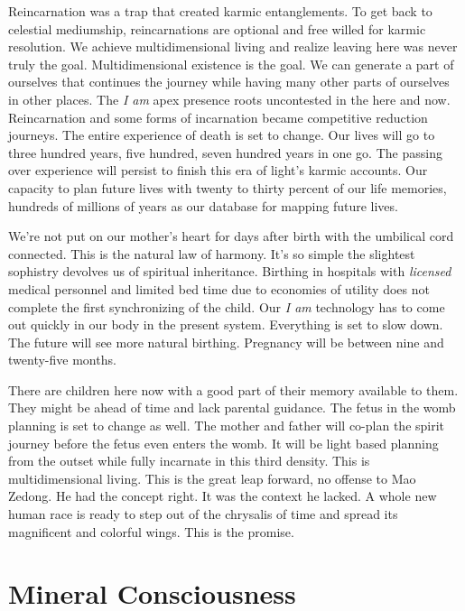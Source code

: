 \documentclass[letterpaper,9pt,twoside,titlepage,onecolumn,openany]{book}
\begin{document}
Reincarnation was a trap that created karmic entanglements. To get back
to celestial mediumship, reincarnations are optional and free willed for
karmic resolution. We achieve multidimensional living and realize
leaving here was never truly the goal. Multidimensional existence is the
goal. We can generate a part of ourselves that continues the journey
while having many other parts of ourselves in other places. The \emph{I
am} apex presence roots uncontested in the here and now. Reincarnation
and some forms of incarnation became competitive reduction journeys. The
entire experience of death is set to change. Our lives will go to three
hundred years, five hundred, seven hundred years in one go. The passing
over experience will persist to finish this era of light's karmic
accounts. Our capacity to plan future lives with twenty to thirty
percent of our life memories, hundreds of millions of years as our
database for mapping future lives.

We're not put on our mother's heart for days after birth with the
umbilical cord connected. This is the natural law of harmony. It's so
simple the slightest sophistry devolves us of spiritual inheritance.
Birthing in hospitals with \emph{licensed} medical personnel and limited
bed time due to economies of utility does not complete the first
synchronizing of the child. Our \emph{I am} technology has to come out
quickly in our body in the present system. Everything is set to slow
down. The future will see more natural birthing. Pregnancy will be
between nine and twenty-five months.

There are children here now with a good part of their memory available
to them. They might be ahead of time and lack parental guidance. The
fetus in the womb planning is set to change as well. The mother and
father will co-plan the spirit journey before the fetus even enters the
womb. It will be light based planning from the outset while fully
incarnate in this third density. This is multidimensional living. This
is the great leap forward, no offense to Mao Zedong. He had the concept
right. It was the context he lacked. A whole new human race is ready to
step out of the chrysalis of time and spread its magnificent and
colorful wings. This is the promise.

\section*{Mineral Consciousness}\label{mineral-consciousness}
\end{document}
